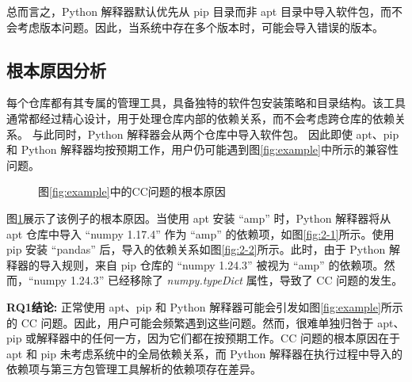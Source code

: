 总而言之，Python 解释器默认优先从 pip 目录而非 apt 目录中导入软件包，而不会考虑版本问题。因此，当系统中存在多个版本时，可能会导入错误的版本。

\subsection{根本原因分析}
每个仓库都有其专属的管理工具，具备独特的软件包安装策略和目录结构。该工具通常都经过精心设计，用于处理仓库内部的依赖关系，而不会考虑跨仓库的依赖关系。
与此同时，Python 解释器会从两个仓库中导入软件包。
因此即使 apt、pip 和 Python 解释器均按预期工作，用户仍可能遇到图\ref{fig:example}中所示的兼容性问题。
\begin{figure}[htbp]
	\centering
	\hspace{4em}
	\caption{图\ref{fig:example}中的CC问题的根本原因}
	\label{fig:2}
\end{figure}
图\ref{fig:2}展示了该例子的根本原因。当使用 apt 安装 “amp” 时，Python 解释器将从 apt 仓库中导入 “numpy 1.17.4” 作为 “amp” 的依赖项，如图\ref{fig:2-1}所示。使用 pip 安装 “pandas” 后，导入的依赖关系如图\ref{fig:2-2}所示。此时，由于 Python 解释器的导入规则，来自 pip 仓库的 “numpy 1.24.3” 被视为 “amp” 的依赖项。然而，“numpy 1.24.3” 已经移除了 \textit{numpy.typeDict} 属性，导致了 CC 问题的发生。

\begin{tcolorbox}[boxrule=1pt,boxsep=1pt,left=2pt,right=2pt,top=2pt,bottom=2pt]
	\small
	\textcolor{red}{} \noindent\textbf{RQ1结论:} 
	正常使用 apt、pip 和 Python 解释器可能会引发如图\ref{fig:example}所示的 CC 问题。因此，用户可能会频繁遇到这些问题。然而，很难单独归咎于 apt、pip 或解释器中的任何一方，因为它们都在按预期工作。CC 问题的根本原因在于 apt 和 pip 未考虑系统中的全局依赖关系，而 Python 解释器在执行过程中导入的依赖项与第三方包管理工具解析的依赖项存在差异。
\end{tcolorbox} 


